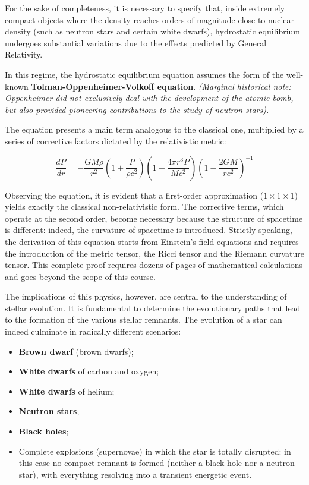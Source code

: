 For the sake of completeness, it is necessary to specify that, inside extremely compact objects where the density reaches orders of magnitude close to nuclear density (such as neutron stars and certain white dwarfs), hydrostatic equilibrium undergoes substantial variations due to the effects predicted by General Relativity.

In this regime, the hydrostatic equilibrium equation assumes the form of the well-known \textbf{Tolman-Oppenheimer-Volkoff equation}.
\textit{(Marginal historical note: Oppenheimer did not exclusively deal with the development of the atomic bomb, but also provided pioneering contributions to the study of neutron stars).}

The equation presents a main term analogous to the classical one, multiplied by a series of corrective factors dictated by the relativistic metric:

\begin{equation}
\frac{dP}{dr} = -\frac{GM\rho}{r^2} \left( 1 + \frac{P}{\rho c^2} \right) \left( 1 + \frac{4\pi r^3 P}{M c^2} \right) \left( 1 - \frac{2GM}{rc^2} \right)^{-1}
\end{equation}

Observing the equation, it is evident that a first-order approximation ($1 \times 1 \times 1$) yields exactly the classical non-relativistic form. The corrective terms, which operate at the second order, become necessary because the structure of spacetime is different: indeed, the curvature of spacetime is introduced.
Strictly speaking, the derivation of this equation starts from Einstein's field equations and requires the introduction of the metric tensor, the Ricci tensor and the Riemann curvature tensor. This complete proof requires dozens of pages of mathematical calculations and goes beyond the scope of this course.

The implications of this physics, however, are central to the understanding of stellar evolution. It is fundamental to determine the evolutionary paths that lead to the formation of the various stellar remnants. The evolution of a star can indeed culminate in radically different scenarios:
\begin{itemize}
\item \textbf{Brown dwarf} (brown dwarfs);
\item \textbf{White dwarfs} of carbon and oxygen;
\item \textbf{White dwarfs} of helium;
\item \textbf{Neutron stars};
\item \textbf{Black holes};
\item Complete explosions (supernovae) in which the star is totally disrupted: in this case no compact remnant is formed (neither a black hole nor a neutron star), with everything resolving into a transient energetic event.
\end{itemize}

